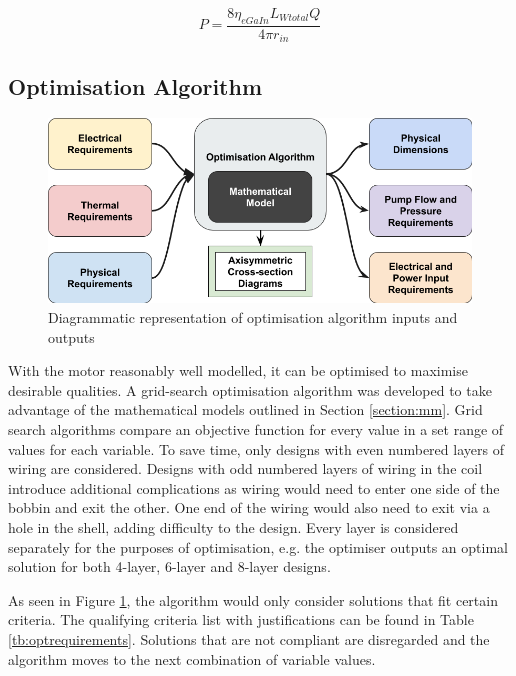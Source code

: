 \documentclass[a4paper,12pt]{article}
\begin{document}
\begin{equation}\label{eq:pressure}
    P=\frac{8\eta_{eGaIn}L_{Wtotal}Q}{4\pi r_{in}}
\end{equation}

\subsection{Optimisation Algorithm} \label{section:optimisation}

\begin{figure}[h!]
    \centering
    \includegraphics[scale=0.4]{optiAlgro.png}
    \caption{Diagrammatic representation of optimisation algorithm inputs and outputs}
    \label{fg:optiAlgo}
\end{figure}

With the motor reasonably well modelled, it can be optimised to maximise desirable qualities. A grid-search optimisation algorithm was developed to take advantage of the mathematical models outlined in Section \ref{section:mm}. Grid search algorithms compare an objective function for every value in a set range of values for each variable. To save time, only designs with even numbered layers of wiring are considered. Designs with odd numbered layers of wiring in the coil introduce additional complications as wiring would need to enter one side of the bobbin and exit the other. One end of the wiring would also need to exit via a hole in the shell, adding difficulty to the design. Every layer is considered separately for the purposes of optimisation, e.g. the optimiser outputs an optimal solution for both 4-layer, 6-layer and 8-layer designs.

As seen in Figure \ref{fg:optiAlgo}, the algorithm would only consider solutions that fit certain criteria. The qualifying criteria list with justifications can be found in Table \ref{tb:optrequirements}. Solutions that are not compliant are disregarded and the algorithm moves to the next combination of variable values.
\end{document}
